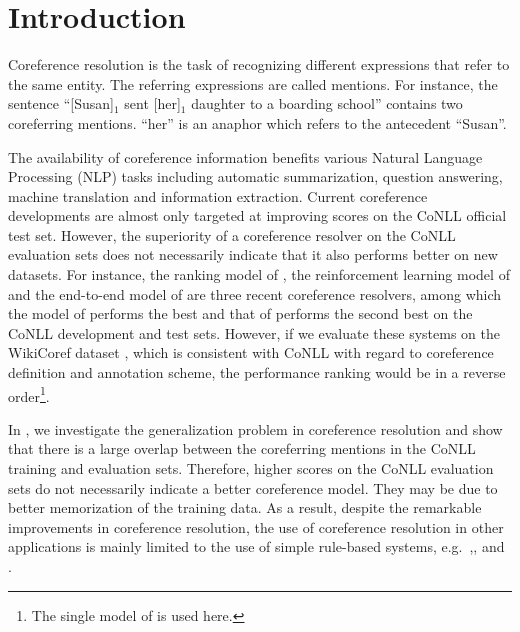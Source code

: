 \section{Introduction}
Coreference resolution is the task of recognizing different expressions that refer to the same entity.
The referring expressions are called mentions.
For instance, the sentence ``[Susan]$_1$ sent [her]$_1$ daughter to a boarding school'' contains two coreferring mentions. ``her'' is an anaphor which refers to the antecedent ``Susan''.

The availability of coreference information benefits various Natural Language Processing (NLP) tasks including 
automatic summarization, question answering, machine translation and information extraction. 
Current coreference developments are almost only targeted at improving scores on the CoNLL official test set.
However,  
the superiority of a coreference resolver on the CoNLL evaluation sets does not necessarily indicate
that it also performs better on new datasets.
For instance, the ranking model of , the reinforcement learning model of  
and the end-to-end model of  are three recent coreference resolvers,
among which the model of  performs the best and that of  
performs the second best on the CoNLL development and test sets.
However, if we evaluate these systems on the WikiCoref dataset \cite{ghaddar16a}, 
which is consistent with CoNLL with regard to coreference definition and annotation scheme, 
the performance ranking would be in a reverse order\footnote{The single model of  is used here.}.

In , we investigate the generalization problem in coreference resolution
and show that there is a large overlap between the coreferring mentions in the CoNLL training and evaluation sets.
Therefore, higher scores on the CoNLL evaluation sets do not necessarily indicate a better coreference model. They
may be due to better memorization of the training data.
As a result, despite the remarkable improvements in coreference resolution,
the use of coreference resolution in other applications is mainly limited to the use of simple rule-based 
systems, e.g.\ ,, and .

